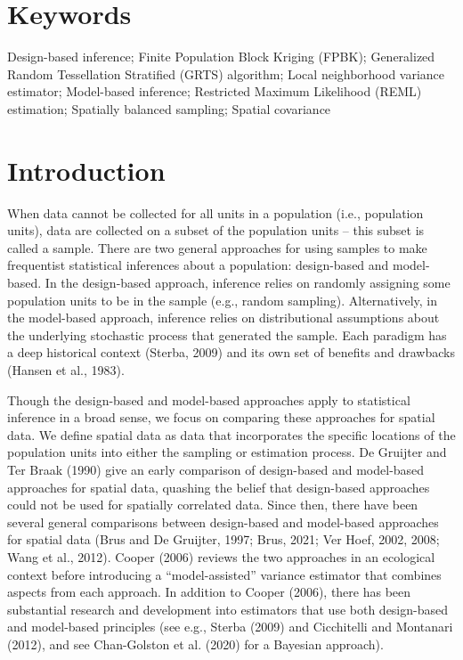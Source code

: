 \documentclass[]{elsarticle} %
\begin{document}
\hypertarget{keywords}{%
\section*{Keywords}\label{keywords}}

Design-based inference; Finite Population Block Kriging (FPBK);
Generalized Random Tessellation Stratified (GRTS) algorithm; Local
neighborhood variance estimator; Model-based inference; Restricted
Maximum Likelihood (REML) estimation; Spatially balanced sampling;
Spatial covariance

\hypertarget{sec:introduction}{%
\section{Introduction}\label{sec:introduction}}

When data cannot be collected for all units in a population (i.e.,
population units), data are collected on a subset of the population
units -- this subset is called a sample. There are two general
approaches for using samples to make frequentist statistical inferences
about a population: design-based and model-based. In the design-based
approach, inference relies on randomly assigning some population units
to be in the sample (e.g., random sampling). Alternatively, in the
model-based approach, inference relies on distributional assumptions
about the underlying stochastic process that generated the sample. Each
paradigm has a deep historical context (Sterba, 2009) and its own set of
benefits and drawbacks (Hansen et al., 1983).

Though the design-based and model-based approaches apply to statistical
inference in a broad sense, we focus on comparing these approaches for
spatial data. We define spatial data as data that incorporates the
specific locations of the population units into either the sampling or
estimation process. De Gruijter and Ter Braak (1990) give an early
comparison of design-based and model-based approaches for spatial data,
quashing the belief that design-based approaches could not be used for
spatially correlated data. Since then, there have been several general
comparisons between design-based and model-based approaches for spatial
data (Brus and De Gruijter, 1997; Brus, 2021; Ver Hoef, 2002, 2008; Wang
et al., 2012). Cooper (2006) reviews the two approaches in an ecological
context before introducing a ``model-assisted'' variance estimator that
combines aspects from each approach. In addition to Cooper (2006), there
has been substantial research and development into estimators that use
both design-based and model-based principles (see e.g., Sterba (2009)
and Cicchitelli and Montanari (2012), and see Chan-Golston et al. (2020)
for a Bayesian approach).
\end{document}
